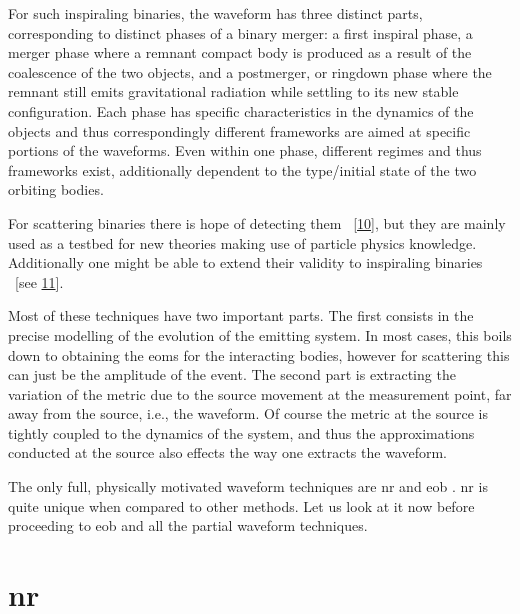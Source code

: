 \documentclass[
  10pt,
  a4paper,
  DIV=11,
  numbers=noendperiod,
  oneside]{scrreprt}
\DeclareRobustCommand{\[}{\begin{equation}}
\DeclareRobustCommand{\]}{\end{equation}}
\begin{document}
For such inspiraling binaries, the waveform has three distinct parts,
corresponding to distinct phases of a binary merger: a first inspiral
phase, a merger phase where a remnant compact body is produced as a
result of the coalescence of the two objects, and a postmerger, or
ringdown phase where the remnant still emits gravitational radiation
while settling to its new stable configuration. Each phase has specific
characteristics in the dynamics of the objects and thus correspondingly
different frameworks are aimed at specific portions of the waveforms.
Even within one phase, different regimes and thus frameworks exist,
additionally dependent to the type/initial state of the two orbiting
bodies.

For scattering binaries there is hope of detecting them
~{[}\protect\hyperlink{ref-Mukherjee:2020hnm}{10}{]}, but they are
mainly used as a testbed for new theories making use of particle physics
knowledge. Additionally one might be able to extend their validity to
inspiraling binaries ~{[}see
\protect\hyperlink{ref-Kalin:2019rwq}{11}{]}.

Most of these techniques have two important parts. The first consists in
the precise modelling of the evolution of the emitting system. In most
cases, this boils down to obtaining the \glspl{eom} for the interacting
bodies, however for scattering this can just be the amplitude of the
event. The second part is extracting the variation of the metric due to
the source movement at the measurement point, far away from the source,
i.e., the waveform. Of course the metric at the source is tightly
coupled to the dynamics of the system, and thus the approximations
conducted at the source also effects the way one extracts the waveform.

The only full, physically motivated waveform techniques are \gls{nr} and
\gls{eob} . \gls{nr} is quite unique when
compared to other methods. Let us look at it now before proceeding to
\gls{eob} and all the partial waveform techniques.

\hypertarget{nr}{%
\section{\texorpdfstring{\gls{nr}}{}}\label{nr}}
\end{document}
